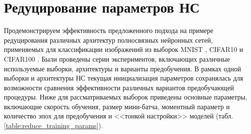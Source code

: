 





\section{Редуцирование параметров НС}

Продемонстрируем эффективность предложенного подхода на примере редуцирования различных архитектур полносвязных нейронных сетей, применяемых для классификации изображений из выборок MNIST \cite{mnist}, CIFAR10 и CIFAR100 \cite{krizhevsky2009learning}.
Были проведены серии экспериментов, включающих различные используемые выборки, архитектуры и варианты предобучения. В рамках одной выборки и архитектуры НС текущая инициализация параметров сохранялась для возможности сравнения эффективности различных вариантов предобучающей процедуры.
Ниже для рассматриваемых выборок приведены основные параметры, включающие скорость обучения, размер мини-батча, моментный параметр и количество эпох для предобучения и <<тонкой настройки>> моделей (табл. \ref{table:reduce_training_params}).


